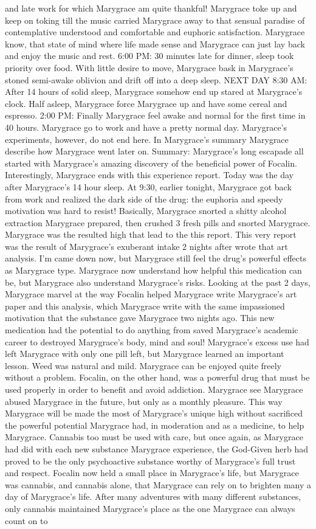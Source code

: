 \documentclass[12pt]{book}
\begin{document}
and late work for which Marygrace am quite thankful! Marygrace toke up and keep on toking till the music carried Marygrace away to that sensual paradise of contemplative understood and comfortable and euphoric satisfaction. Marygrace know, that state of mind where life made sense and Marygrace can just lay back and enjoy the music and rest. 6:00 PM: 30 minutes late for dinner, sleep took priority over food. With little desire to move, Marygrace bask in Marygrace's stoned semi-awake oblivion and drift off into a deep sleep. NEXT DAY 8:30 AM: After 14 hours of solid sleep, Marygrace somehow end up stared at Marygrace's clock. Half asleep, Marygrace force Marygrace up and have some cereal and espresso. 2:00 PM: Finally Marygrace feel awake and normal for the first time in 40 hours. Marygrace go to work and have a pretty normal day. Marygrace's experiments, however, do not end here. In Marygrace's summary Marygrace describe how Marygrace went later on. Summary: Marygrace's long escapade all started with Marygrace's amazing discovery of the beneficial power of Focalin. Interestingly, Marygrace ends with this experience report. Today was the day after Marygrace's 14 hour sleep. At 9:30, earlier tonight, Marygrace got back from work and realized the dark side of the drug: the euphoria and speedy motivation was hard to resist! Basically, Marygrace snorted a shitty alcohol extraction Marygrace prepared, then crushed 3 fresh pills and snorted Marygrace. Marygrace was the resulted high that lead to the this report. This very report was the result of Marygrace's exuberant intake 2 nights after wrote that art analysis. I'm came down now, but Marygrace still feel the drug's powerful effects as Marygrace type. Marygrace now understand how helpful this medication can be, but Marygrace also understand Marygrace's risks. Looking at the past 2 days, Marygrace marvel at the way Focalin helped Marygrace write Marygrace's art paper and this analysis, which Marygrace write with the same impassioned motivation that the substance gave Marygrace two nights ago. This new medication had the potential to do anything from saved Marygrace's academic career to destroyed Marygrace's body, mind and soul! Marygrace's excess use had left Marygrace with only one pill left, but Marygrace learned an important lesson. Weed was natural and mild. Marygrace can be enjoyed quite freely without a problem. Focalin, on the other hand, was a powerful drug that must be used properly in order to benefit and avoid addiction. Marygrace see Marygrace abused Marygrace in the future, but only as a monthly pleasure. This way Marygrace will be made the most of Marygrace's unique high without sacrificed the powerful potential Marygrace had, in moderation and as a medicine, to help Marygrace. Cannabis too must be used with care, but once again, as Marygrace had did with each new substance Marygrace experience, the God-Given herb had proved to be the only psychoactive substance worthy of Marygrace's full trust and respect. Focalin now held a small place in Marygrace's life, but Marygrace was cannabis, and cannabis alone, that Marygrace can rely on to brighten many a day of Marygrace's life. After many adventures with many different substances, only cannabis maintained Marygrace's place as the one Marygrace can always count on to 
\end{document}
